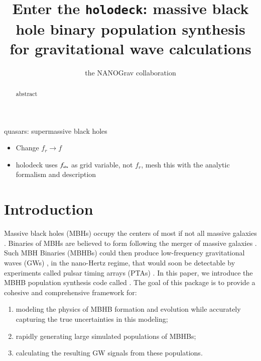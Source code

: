 \documentclass[useAMS, usenatbib]{mnras}
\title[holodeck: MBH binary populations]{Enter the \texttt{holodeck}: massive black hole binary population synthesis for gravitational wave calculations}
\author[NANOGrav]{the NANOGrav collaboration}
\begin{document}
\maketitle

\begin{abstract}
    abstract
\end{abstract}

\begin{keywords}
    quasars: supermassive black holes
\end{keywords}





\begin{itemize}
    \item Change $f_r \rightarrow f$
    \item holodeck uses $f_\trt{obs}$ as grid variable, not $f_r$, mesh this with the analytic formalism and description
\end{itemize}


\section{Introduction}
    \label{sec:intro}

    Massive black holes (MBHs) occupy the centers of most if not all massive galaxies \needcite{}.
    Binaries of MBHs are believed to form following the merger of massive galaxies \needcite{}.  Such MBH Binaries (MBHBs) could then produce low-frequency gravitational waves (GWs) , in the nano-Hertz regime, that would soon be detectable by experiments called pulsar timing arrays (PTAs) .  In this paper, we introduce the MBHB population synthesis code called \holodeck{}.  The goal of this package is to provide a cohesive and comprehensive framework for:
    \begin{enumerate}
        \item
        modeling the physics of MBHB formation and evolution while accurately capturing the true uncertainties in this modeling;
        \item
        rapidly generating large simulated populations of MBHBs;
        \item
        calculating the resulting GW signals from these populations.
    \end{enumerate}
\end{document}

